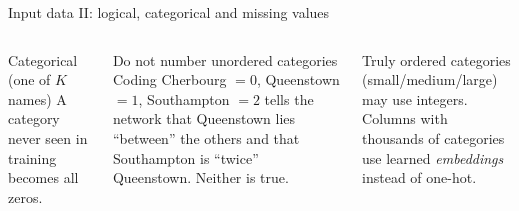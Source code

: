 \documentclass[aspectratio=169,10pt]{beamer}
\begin{document}
\begin{frame}{Input data II: logical, categorical and missing values}
\begin{columns}[T,onlytextwidth]
\begin{block}{\color{cOut}Categorical (one of $K$ names)}
\vspace{1mm}
A category never seen in training becomes all zeros.
\end{block}
\begin{block}{Do not number unordered categories}
\footnotesize
Coding Cherbourg $=0$, Queenstown $=1$, Southampton $=2$ tells the network that Queenstown lies
``between'' the others and that Southampton is ``twice'' Queenstown. Neither is true.
\end{block}
{\footnotesize Truly ordered categories (small/medium/large) may use integers. Columns with
thousands of categories use learned \emph{embeddings} instead of one-hot.}
\end{columns}
\end{frame}

\end{document}
